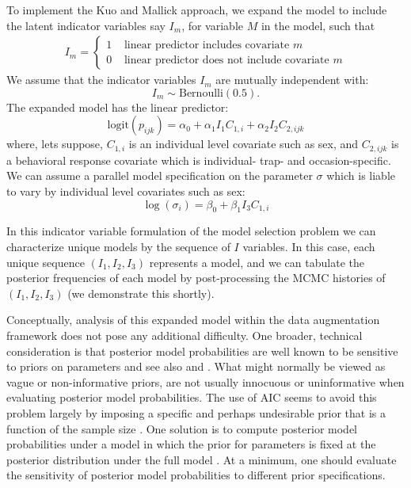 To implement the Kuo and Mallick approach, we expand the model to
include the latent indicator variables say $I_{m}$, for variable $M$
in the model, such that
\begin{eqnarray*}
I_{m} = \left\{
\begin{array}{cc} 1 &  \mbox{ linear predictor includes  covariate $m$} \\
                  0 & \mbox{ linear predictor does not
                                include covariate $m$}
 \end{array}
\right.
\end{eqnarray*}
We assume that the indicator variables $I_{m}$ are mutually
independent with:
\[
I_m \sim \mbox{Bernoulli}(0.5).
\]
The expanded model has the linear predictor:
\[
\mbox{logit}(p_{ijk}) = \alpha_{0} + \alpha_{1}I_{1} C_{1,i} + \alpha_{2}I_{2} C_{2,ijk}
\]
where, lets suppose, $C_{1,i}$ is an individual level covariate such
as sex, and $C_{2,ijk}$ is a behavioral response covariate which is
individual- trap- and occasion-specific.  We can assume a parallel
model specification on the parameter $\sigma$ which is liable to vary
by individual level covariates such as sex:
\[
 \log(\sigma_{i}) = \beta_{0} + \beta_{1} I_{3} C_{1,i}
\]

In this indicator variable formulation of the model selection problem we can characterize
unique models by the sequence of $I$ variables. In this case, each
unique sequence $(I_{1},I_{2},I_{3})$ represents  a model, and we can
tabulate the posterior frequencies of each model by post-processing
the MCMC histories of $(I_{1},I_{2},I_{3})$ (we demonstrate this
shortly).

Conceptually, analysis of this expanded model within the data
augmentation framework does not pose any additional difficulty. One
broader, technical consideration is that posterior model probabilities
are well known to be sensitive to priors on parameters
\citep{aitkin:1991, link_barker:2006} and see also
\citet[][sec. 3.4.3]{royle_dorazio:2008} and
\citet[][sec. 7.2.5]{link_barker:2010}.  What might normally be viewed
as vague or non-informative priors, are not usually innocuous or
uninformative when evaluating posterior model probabilities. The use
of AIC
seems to avoid this problem largely
by imposing a specific and perhaps undesirable prior that is a
function of the sample size \citep{kadane_lazar:2004}. One solution is
to compute posterior model probabilities under a model in which the
prior for parameters is fixed at the posterior distribution under the
full model \citep{aitkin:1991}. At a minimum, one should evaluate
the sensitivity of posterior model probabilities to  different prior
specifications.  


